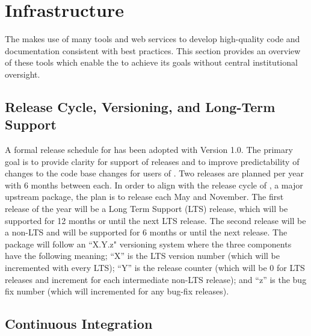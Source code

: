 \section{Infrastructure}
\label{sec:infrastructure}

The \sunpyproj makes use of many tools and web services to develop high-quality code and documentation consistent with best practices.
This section provides an overview of these tools which enable the \sunpyproj to achieve its goals without central institutional oversight.

\subsection{Release Cycle, Versioning, and Long-Term Support}
\label{sec:release}

A formal release schedule for \sunpypkg has been adopted with Version 1.0.
The primary goal is to provide clarity for support of releases and to improve predictability of changes to the code base changes for users of \sunpypkg.
Two releases are planned per year with 6 months between each.
In order to align with the release cycle of \astropypkg, a major upstream package, the plan is to release each May and November.
The first release of the year will be a Long Term Support (LTS) release, which will be supported for 12 months or until the next LTS release.
The second release will be a non-LTS and will be supported for 6 months or until the next release.
The \sunpypkg package will follow an ``X.Y.z" versioning system where the three components have the following meaning;
``X'' is the LTS version number (which will be incremented with every LTS); ``Y'' is the release counter (which will be 0 for LTS releases and increment for each intermediate non-LTS release); and ``z'' is the bug fix number (which will incremented for any bug-fix releases). 




\subsection{Continuous Integration}
\label{sec:continuous-integration}

